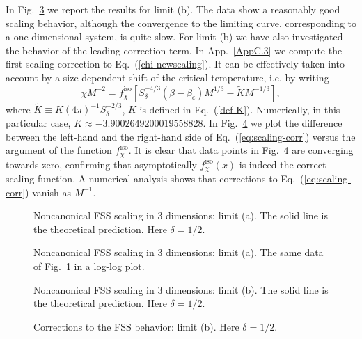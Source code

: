 \documentclass[a4paper,12pt]{article}
\begin{document}
In Fig.~\ref{fig:anomalous2a} we report the results for limit (b). 
The data show a reasonably good scaling behavior, although the convergence to 
the limiting curve, corresponding to a one-dimensional system, is quite slow. 
For limit (b) we have also investigated the behavior of the leading correction 
term.  In App.~\ref{AppC.3} we compute the first scaling correction to 
Eq.~(\ref{chi-newscaling}). 
It can be effectively taken into account by a size-dependent 
shift of the critical temperature, i.e. by writing 
\begin{equation}
\label{eq:scaling-corr}
\chi M^{-2} = f_{\chi}^{\text{iso}}[S_{\delta}^{-4/3} (\beta-\beta_{c}) M^{1/3}
           - \tilde K M^{-1/3}] ,
\end{equation}
where $\tilde K \equiv K (4 \pi)^{-1} S_{\delta}^{-2/3}$, $K$ is 
defined in Eq.~(\ref{def-K}). Numerically, in this particular case, 
$K \approx -3.9002649200019558828$. 
In Fig.~\ref{fig:anomalous2b} we plot the difference between the left-hand and 
the right-hand side of Eq.~(\ref{eq:scaling-corr}) versus the argument of the 
function $f_{\chi}^{\text{iso}}$. It is clear that data points in 
Fig.~\ref{fig:anomalous2b} are converging towards zero, confirming that 
asymptotically $f_{\chi}^{\text{iso}}(x)$ is indeed the correct scaling
function. A numerical analysis shows that corrections to 
Eq.~(\ref{eq:scaling-corr}) vanish as $M^{-1}$.

\begin{figure}
\caption{Noncanonical FSS scaling in 3 dimensions: limit (a). The solid line 
is the theoretical prediction. Here $\delta = 1/2$. }
\label{fig:anomalous1}
\end{figure}

\begin{figure}
\caption{Noncanonical FSS scaling in 3 dimensions: limit (a). The same data 
of Fig.~\protect\ref{fig:anomalous1} in a log-log plot.}
\label{fig:anomalous1-log}
\end{figure}


\begin{figure}
\caption{Noncanonical FSS scaling in 3 dimensions: limit (b). The solid line
is the theoretical prediction. Here $\delta = 1/2$. }
\label{fig:anomalous2a}
\end{figure}

\begin{figure}
\caption{Corrections to the FSS behavior: limit (b). Here $\delta = 1/2$.}
\label{fig:anomalous2b}
\end{figure}
%
\end{document}
